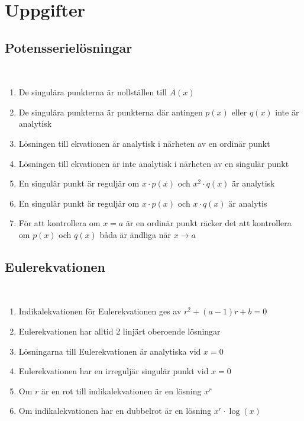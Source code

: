 \section{Uppgifter}

\subsection{Potensserielösningar}\hfill\\
\par

\begin{enumerate}

  \item De singulära punkterna är nollställen till $A(x)$
  \item De singulära punkterna är punkterna där antingen $p(x)$ eller $q(x)$ inte är analytisk
  \item Lösningen till ekvationen är analytisk i närheten av en ordinär punkt
  \item Lösningen till ekvationen är inte analytisk i närheten av en singulär punkt
  \item En singulär punkt är reguljär om $x\cdot p(x)$ och $x^2\cdot q(x)$ är analytisk
  \item En singulär punkt är reguljär om $x\cdot p(x)$ och $x\cdot q(x)$ är analytis
  \item För att kontrollera om $x=a$ är en ordinär punkt räcker det att kontrollera om $p(x)$ och $q(x)$ båda är ändliga när $x\to a$

\end{enumerate}
\par\bigskip

\subsection{Eulerekvationen}\hfill\\
\par

\begin{enumerate}

  \item Indikalekvationen för Eulerekvationen ges av $r^2+(a-1)r+b=0$
  \item Eulerekvationen har alltid 2 linjärt oberoende lösningar
  \item Lösningarna till Eulerekvationen är analytiska vid $x=0$
  \item Eulerekvationen har en irreguljär singulär punkt vid $x=0$
  \item Om $r$ är en rot till indikalekvationen är en lösning $x^r$
  \item Om indikalekvationen har en dubbelrot är en lösning $x^r\cdot\log(x)$

\end{enumerate}
\par\bigskip

